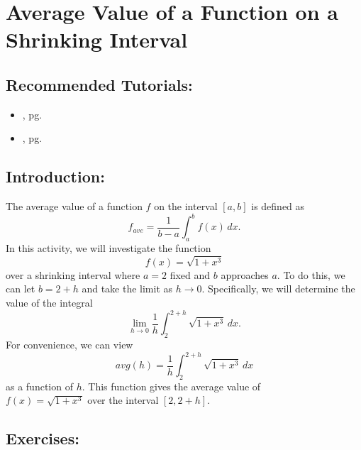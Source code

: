 \section{Average Value of a Function on a Shrinking Interval}
\label{sec:average_value_of_function}	

\subsection*{Recommended Tutorials:}
\begin{itemize}[noitemsep]
	\item {}, pg. \pageref{chp:limits}
	\item {}, pg. \pageref{chp:definite_and_indefinite_Integrals}
\end{itemize}

\subsection*{Introduction:}

The average value of a function $f$ on the interval $[a,b]$ is defined as 
\[ f_{ave} = \frac{1}{b-a} \int_{a}^{b} f(x) \, dx. \]
In this activity, we will investigate the function 
\[ f(x) = \sqrt{1 + x^3} \]
over a shrinking interval where $a = 2$ fixed and $b$ approaches $a$. To do this, we can let $b=2+h$ and take the limit as $h \rightarrow 0$. Specifically, we will determine the value of the integral
\[\displaystyle\lim_{h \rightarrow 0} \dfrac{1}{h} \displaystyle\int_{2}^{2+h} \sqrt{1 + x^3}\, dx.\]
For convenience, we can view 
\[avg(h) = \frac{1}{h}\displaystyle\int_{2}^{2+h} \sqrt{1 + x^3}\, dx\]
as a function of $h$. This function gives the average value of \\\noindent $f(x) = \sqrt{1 + x^3}$ over the interval $[2,2+h]$.

\subsection*{Exercises:}

